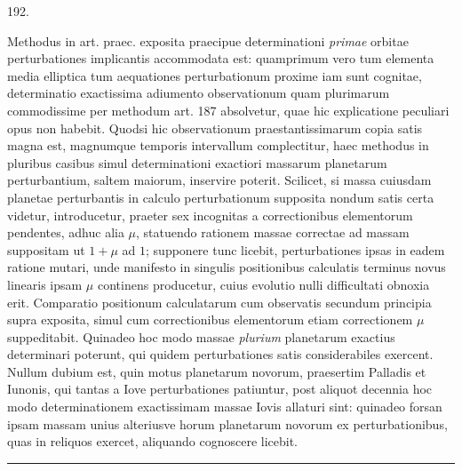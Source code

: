 \begin{center}\hypertarget{native-266-article192}{}192.\end{center}
Methodus in art. praec. exposita praecipue determinationi \emph{primae} orbitae
perturbationes implicantis accommodata est: quamprimum vero tum elementa
media elliptica tum aequationes perturbationum proxime iam sunt cognitae,
determinatio exactissima adiumento observationum quam plurimarum commodissime
per methodum art. 187 absolvetur, quae hic explicatione peculiari
opus non habebit. Quodsi hic observationum praestantissimarum copia satis
magna est, magnumque temporis intervallum complectitur, haec methodus in
pluribus casibus simul determinationi exactiori massarum planetarum perturbantium,
saltem maiorum, inservire poterit. Scilicet, si massa cuiusdam planetae
perturbantis in calculo perturbationum supposita nondum satis certa
videtur, introducetur, praeter sex incognitas a correctionibus elementorum pendentes,
adhuc alia $\mu$, statuendo rationem massae correctae ad massam suppositam
ut $1+\mu$ ad $1$; supponere tunc licebit, perturbationes ipsas in eadem
ratione mutari, unde manifesto in singulis positionibus calculatis terminus
novus linearis ipsam $\mu$ continens producetur, cuius evolutio nulli difficultati
obnoxia erit. Comparatio positionum calculatarum cum observatis secundum
principia supra exposita, simul cum correctionibus elementorum etiam correctionem
$\mu$ suppeditabit. Quinadeo hoc modo massae \emph{plurium} planetarum exactius
determinari poterunt, qui quidem perturbationes satis considerabiles
exercent. Nullum dubium est, quin motus planetarum novorum, praesertim
Palladis et Iunonis, qui tantas a Iove perturbationes patiuntur, post aliquot
decennia hoc modo determinationem exactissimam massae Iovis allaturi sint:
quinadeo forsan ipsam massam unius alteriusve horum planetarum novorum
ex perturbationibus, quas in reliquos exercet, aliquando cognoscere licebit.
\begin{center}\rule{3cm}{.4pt}\end{center}
